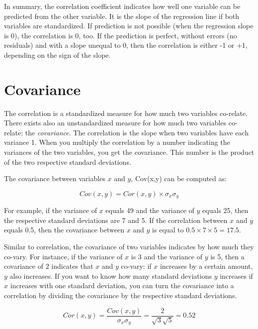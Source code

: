 \documentclass[]{report}\usepackage[]{graphicx}\usepackage[]{color}
\begin{document}
In summary, the correlation coefficient indicates how well one variable can be predicted from the other variable. It is the slope of the regression line if both variables are standardized. If prediction is not possible (when the regression slope is 0), the correlation is 0, too. If the prediction is perfect, without errors (no residuals) and with a slope unequal to 0, then the correlation is either -1 or +1, depending on the sign of the slope.

\section{Covariance}

The correlation is a standardized measure for how much two variables co-relate. There exists also an unstandardized measure for how much two variables co-relate: the \textit{covariance}. The correlation is the slope when two variables have each variance 1. When you multiply the correlation by a number indicating the variances of the two variables, you get the covariance. This number is the product of the two respective standard deviations.

The covariance between variables $x$ and $y$, Cov(x,y) can be computed as:


\begin{equation}
Cov(x,y)= Cor(x,y) \times \sigma_x \sigma_y
\end{equation}

For example, if the variance of $x$ equals 49 and the variance of $y$ equals 25, then the respective standard deviations are 7 and 5. If the correlation between $x$ and $y$ equals 0.5, then the covariance between $x$ and $y$ is equal to $0.5 \times 7 \times 5 = 17.5$.

Similar to correlation, the covariance of two variables indicates by how much they co-vary. For instance, if the variance of $x$ is 3 and the variance of $y$ is 5, then a covariance of 2 indicates that $x$ and $y$ co-vary: if $x$ increases by a certain amount, $y$ also increases. If you want to know how many standard deviations $y$ increases if $x$ increases with one standard deviation, you can turn the covariance into a correlation by dividing the covariance by the respective standard deviations.

\begin{equation}
Cor(x,y)= \frac{Cov(x,y)} { \sigma_x \sigma_y}= \frac{2} { \sqrt{3} \sqrt{5}}=0.52
\end{equation}
\end{document}

